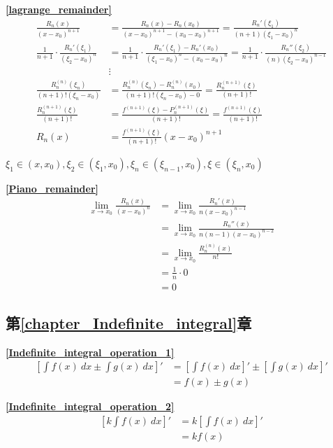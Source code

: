 \textbf{\large \ref{lagrange_remainder}}
\begin{align*}
    \frac{R_n(x)}{(x-x_0)^{n+1}}&=\frac{R_n(x)-R_n(x_0)}{(x-x_0)^{n+1}-(x_0-x_0)^{n+1}}=\frac{R_n'(\xi_1)}{(n+1)(\xi_1-x_0)^n}\\
    \frac{1}{n+1}\cdot\frac{R_n'(\xi_1)}{(\xi_2-x_0)^n}&=\frac{1}{n+1}\cdot\frac{R_n'(\xi_1)-R_n'(x_0)}{(\xi_1-x_0)^{n}-(x_0-x_0)^{n}}=\frac{1}{n+1}\cdot\frac{R_n''(\xi_2)}{(n)(\xi_2-x_0)^{n-1}}\\
    &\vdots\\
    \frac{R_n^{(n)}(\xi_n)}{(n+1)!(\xi_n-x_0)}&=\frac{R_n^{(n)}(\xi_n)-R_n^{(n)}(x_0)}{(n+1)!(\xi_n-x_0)-0}=\frac{R_n^{(n+1)}(\xi)}{(n+1)!}\\
    \frac{R_n^{(n+1)}(\xi)}{(n+1)!}&=\frac{f^{(n+1)}(\xi)-P_n^{(n+1)}(\xi)}{(n+1)!}=\frac{f^{(n+1)}(\xi)}{(n+1)!}\\
    R_n(x)&=\frac{f^{(n+1)}(\xi)}{(n+1)!}(x-x_0)^{n+1}
\end{align*}
\centerline{$\xi_1\in(x,x_0),\xi_2\in(\xi_1,x_0),\xi_n\in(\xi_{n-1},x_0),\xi\in(\xi_n,x_0)$}

\textbf{\large \ref{Piano_remainder}}
\begin{align*}
      \lim\limits_{x\to x_0}\frac{R_n(x)}{(x-x_0)^n}&=\lim\limits_{x\to x_0}\frac{R_n'(x)}{n(x-x_0)^{n-1}}\\
      &=\lim\limits_{x\to x_0}\frac{R_n''(x)}{n(n-1)(x-x_0)^{n-2}}\\
      &=\lim\limits_{x\to x_0}\frac{R_n^{(n)}(x)}{n!}\\
      &=\frac{1}{n}\cdot 0\\
      &=0
\end{align*}

\subsection{\centering 第\ref{chapter_Indefinite_integral}章}
\textbf{\large \ref{Indefinite_integral_operation_1}}
\begin{align*}
    \left[\int f(x)\ dx \pm \int g(x)\ dx\right]'&=\left[\int f(x) \ dx\right]'\pm \left[\int g(x) \ dx\right]'\\
    &=f(x) \pm g(x)
\end{align*}

\textbf{\large \ref{Indefinite_integral_operation_2}}
\begin{align*}
    \left[k\int f(x)\ dx\right]'&=k\left[\int f(x)\ dx\right]'\\
    &=kf(x)
\end{align*}

